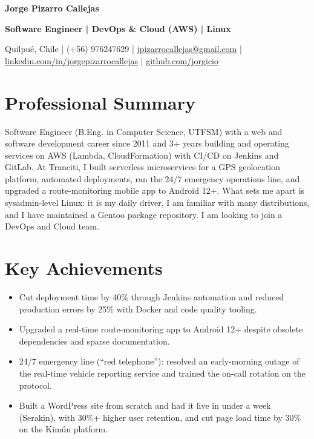 \documentclass[10pt,letterpaper]{article}
\begin{document}
{\LARGE\bfseries Jorge Pizarro Callejas}\par\vspace{3pt}
{\large\bfseries Software Engineer | DevOps \& Cloud (AWS) | Linux}\par\vspace{3pt}
Quilpué, Chile | (+56) 976247629 | \href{mailto:jpizarrocallejas@gmail.com}{jpizarrocallejas@gmail.com} | \href{https://linkedin.com/in/jorgepizarrocallejas}{linkedin.com/in/jorgepizarrocallejas} | \href{https://github.com/jorgicio}{github.com/jorgicio}\par

\section{Professional Summary}
Software Engineer (B.Eng. in Computer Science, UTFSM) with a web and software development career since 2011 and 3+ years building and operating services on AWS (Lambda, CloudFormation) with CI/CD on Jenkins and GitLab. At Tranciti, I built serverless microservices for a GPS geolocation platform, automated deployments, ran the 24/7 emergency operations line, and upgraded a route-monitoring mobile app to Android 12+. What sets me apart is sysadmin-level Linux: it is my daily driver, I am familiar with many distributions, and I have maintained a Gentoo package repository. I am looking to join a DevOps and Cloud team.

\section{Key Achievements}
\begin{itemize}
  \item Cut deployment time by 40\% through Jenkins automation and reduced production errors by 25\% with Docker and code quality tooling.
  \item Upgraded a real-time route-monitoring app to Android 12+ despite obsolete dependencies and sparse documentation.
  \item 24/7 emergency line (``red telephone''): resolved an early-morning outage of the real-time vehicle reporting service and trained the on-call rotation on the protocol.
  \item Built a WordPress site from scratch and had it live in under a week (Serakin), with 30\%+ higher user retention, and cut page load time by 30\% on the Kimún platform.
\end{itemize}
\end{document}

